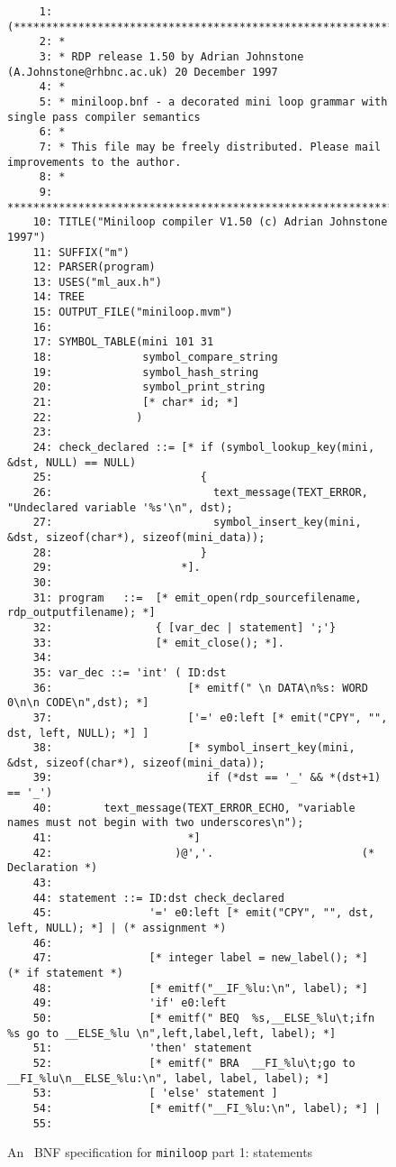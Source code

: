 \begin{figure}
\hspace*{-2.5cm}
\begin{minipage}{30cm}
\footnotesize
\begin{verbatim}
     1: (*******************************************************************************
     2: *
     3: * RDP release 1.50 by Adrian Johnstone (A.Johnstone@rhbnc.ac.uk) 20 December 1997
     4: *
     5: * miniloop.bnf - a decorated mini loop grammar with single pass compiler semantics
     6: *
     7: * This file may be freely distributed. Please mail improvements to the author.
     8: *
     9: *******************************************************************************)
    10: TITLE("Miniloop compiler V1.50 (c) Adrian Johnstone 1997")
    11: SUFFIX("m")
    12: PARSER(program)
    13: USES("ml_aux.h")
    14: TREE
    15: OUTPUT_FILE("miniloop.mvm")
    16: 
    17: SYMBOL_TABLE(mini 101 31
    18:              symbol_compare_string
    19:              symbol_hash_string
    20:              symbol_print_string
    21:              [* char* id; *]
    22:             )
    23: 
    24: check_declared ::= [* if (symbol_lookup_key(mini, &dst, NULL) == NULL)
    25:                       {
    26:                         text_message(TEXT_ERROR, "Undeclared variable '%s'\n", dst);
    27:                         symbol_insert_key(mini, &dst, sizeof(char*), sizeof(mini_data));
    28:                       }
    29:                    *].
    30: 
    31: program   ::=  [* emit_open(rdp_sourcefilename, rdp_outputfilename); *]
    32:                { [var_dec | statement] ';'} 
    33:                [* emit_close(); *].
    34: 
    35: var_dec ::= 'int' ( ID:dst 
    36:                     [* emitf(" \n DATA\n%s: WORD 0\n\n CODE\n",dst); *]
    37:                     ['=' e0:left [* emit("CPY", "", dst, left, NULL); *] ] 
    38:                     [* symbol_insert_key(mini, &dst, sizeof(char*), sizeof(mini_data)); 
    39:                        if (*dst == '_' && *(dst+1) == '_')
    40:        text_message(TEXT_ERROR_ECHO, "variable names must not begin with two underscores\n");
    41:                     *]
    42:                   )@','.                       (* Declaration *)
    43: 
    44: statement ::= ID:dst check_declared
    45:               '=' e0:left [* emit("CPY", "", dst, left, NULL); *] | (* assignment *)
    46: 
    47:               [* integer label = new_label(); *]                    (* if statement *)
    48:               [* emitf("__IF_%lu:\n", label); *]
    49:               'if' e0:left
    50:               [* emitf(" BEQ  %s,__ELSE_%lu\t;ifn %s go to __ELSE_%lu \n",left,label,left, label); *]
    51:               'then' statement
    52:               [* emitf(" BRA  __FI_%lu\t;go to __FI_%lu\n__ELSE_%lu:\n", label, label, label); *]
    53:               [ 'else' statement ]
    54:               [* emitf("__FI_%lu:\n", label); *] |
    55: 
\end{verbatim}
\end{minipage}
\caption{An \rdp\ BNF specification for {\tt miniloop} part 1: statements}
\label{miniloop:bnf1}
\end{figure}
